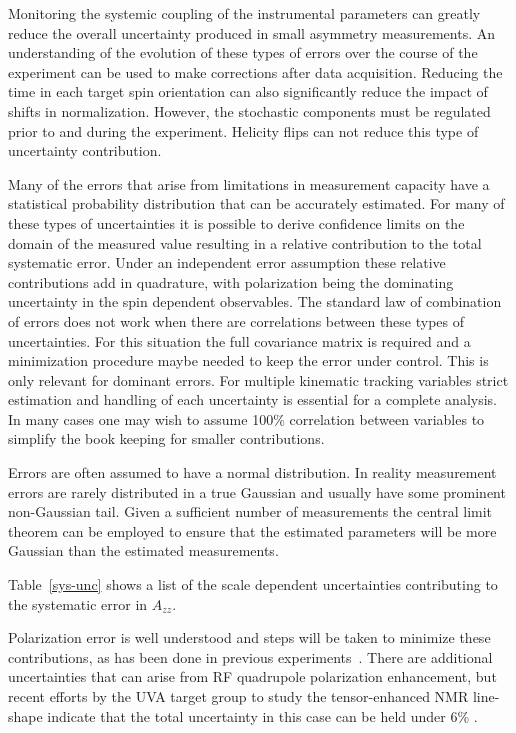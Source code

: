 Monitoring the systemic coupling of the instrumental parameters can greatly reduce the overall uncertainty produced in small asymmetry measurements. An understanding of the evolution of these types of errors over the course of the experiment can be used to make corrections after data acquisition.  Reducing the time in each target spin orientation can also significantly reduce the impact of shifts in normalization.  However, the stochastic components must be regulated prior to and during the experiment.  Helicity flips can not reduce this type of uncertainty contribution.

Many of the errors that arise from limitations in measurement capacity have a statistical probability distribution that can be accurately estimated. 
For many of these types of uncertainties it is possible to derive confidence limits on the domain of the measured value resulting in a relative
contribution to the total systematic error.  Under an independent error assumption these relative contributions add in quadrature, with polarization
being the dominating uncertainty in the spin dependent observables.  The standard law of combination of errors does not work when there are correlations between these types of uncertainties.  For this situation the full covariance matrix is required and a minimization procedure 
maybe needed to keep the error under control.  This is only relevant for dominant errors.  For multiple kinematic tracking variables strict
estimation and handling of each uncertainty is essential for a complete analysis. In many cases one may wish to assume 100\% correlation between variables to simplify the book keeping for smaller contributions.

Errors are often assumed to have a normal distribution.  In reality measurement errors are rarely distributed
in a true Gaussian and usually have some prominent non-Gaussian tail.  Given a sufficient number of measurements the central limit theorem can
be employed to ensure that the estimated parameters will be more Gaussian than the estimated measurements.

Table~\ref{sys-unc} shows a list of the scale dependent uncertainties contributing to the systematic error in $A_{zz}$.

Polarization error is well understood and steps will be taken to minimize these contributions, as has been done in previous experiments~\cite{keller1}.  There are additional uncertainties that can arise from RF quadrupole polarization enhancement, but recent efforts by the UVA target group to study the tensor-enhanced NMR line-shape indicate that the total uncertainty in this case can be held
under 6\% \cite{keller2,keller3}.

